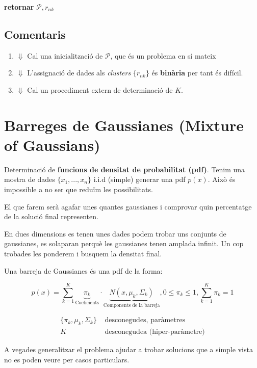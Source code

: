 \documentclass[a4paper]{article}
\begin{document}
\textbf{retornar} $\mathcal{P},r_{nk}$


\subsection{Comentaris}

\begin{enumerate}
	\item $\Downarrow$ Cal una inicialització de $\mathcal{P}$, que és un problema en sí mateix
	\item $\Downarrow$ L'assignació de dades als \emph{clusters} $\{r_{nk}\}$ és \textbf{binària} per tant és difícil.
	\item $\Downarrow$ Cal un procediment extern de determinació de $K$.
\end{enumerate}

\section{Barreges de Gaussianes (Mixture of Gaussians)}

Determinació de \textbf{funcions de densitat de probabilitat (pdf)}. Tenim una mostra de dades  $\{x_1,...,x_n\}$ i.i.d (simple) generar una pdf $p(x)$. Això és impossible a no ser que reduïm les possibilitats.

El que farem serà agafar unes quantes gaussianes i comprovar quin percentatge de la solució final representen.


En dues dimensions es tenen unes dades podem trobar uns conjunts de gaussianes, es solaparan perquè les gaussianes tenen amplada infinit. Un cop trobades les ponderem i busquem la densitat final.


Una barreja de Gaussianes és una pdf de la forma:

$$ p(x) = \sum_{k=1}^K \underbrace{\pi_k}_{\text{Coeficients}}·\underbrace{N(x, \mu_k, \Sigma_k)}_{\text{Components de la barreja}}, 0 \le \pi_k \le 1, \sum_{k=1}^K \pi_k = 1$$

\begin{align*}
	\{\pi_k, \mu_k, \Sigma_k\} & \text{  desconegudes, paràmetres} \\
	K & \text{  desconegudea (hiper-paràmetre)}
\end{align*}

A vegades generalitzar el problema ajudar a trobar solucions que a simple vista no es poden veure per casos particulars. 
\end{document}
